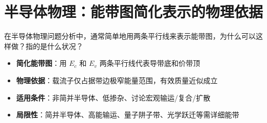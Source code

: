 \section{半导体物理：能带图简化表示的物理依据}
\label{sec:simplified-band-diagram}

\begin{modelbox}[题目：半导体能带图的简化表示]
在半导体物理问题分析中，通常简单地用两条平行线来表示能带图，为什么可以这样做？指的是什么状况？
\end{modelbox}

\begin{tipbox}[考点快速分析]
\begin{itemize}
    \item \textbf{简化能带图}：用 $E_c$ 和 $E_v$ 两条平行线代表导带底和价带顶
    \item \textbf{物理依据}：载流子仅占据带边极窄能量范围，有效质量近似成立
    \item \textbf{适用条件}：非简并半导体、低掺杂、讨论宏观输运/复合/扩散
    \item \textbf{局限性}：简并半导体、高能输运、量子阱子带、光学跃迁等需详细能带
\end{itemize}
\end{tipbox}

